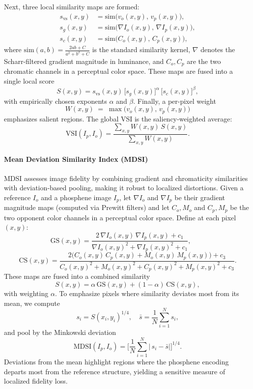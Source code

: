 Next, three local similarity maps are formed:
\begin{align*}
s_{\mathrm{vs}}(x,y)
&= \mathrm{sim}\bigl(v_o(x,y),\,v_p(x,y)\bigr),\\
s_{g}(x,y)
&= \mathrm{sim}\bigl(\nabla I_o(x,y),\,\nabla I_p(x,y)\bigr),\\
s_{c}(x,y)
&= \mathrm{sim}\bigl(C_o(x,y),\,C_p(x,y)\bigr),
\end{align*}
where \(\mathrm{sim}(a,b)=\frac{2ab + C}{a^2 + b^2 + C}\) is the standard similarity kernel, \(\nabla\) denotes the Scharr‐filtered gradient magnitude in luminance, and \(C_o,C_p\) are the two chromatic channels in a perceptual color space.  These maps are fused into a single local score
\[
S(x,y)
= s_{\mathrm{vs}}(x,y)\,\bigl[s_{g}(x,y)\bigr]^{\alpha}\,\bigl[s_{c}(x,y)\bigr]^{\beta},
\]
with empirically chosen exponents \(\alpha\) and \(\beta\).  Finally, a per-pixel weight
\[
W(x,y) \;=\;\max\!\bigl(v_o(x,y),\,v_p(x,y)\bigr)
\]
emphasizes salient regions.  The global VSI is the saliency‐weighted average:
\[
\mathrm{VSI}(I_p,I_o)
= \frac{\sum_{x,y}W(x,y)\,S(x,y)}
       {\sum_{x,y}W(x,y)}.
\]


\paragraph{Mean Deviation Similarity Index (MDSI)}  
MDSI \cite{ZiaeiNafchi2016} assesses image fidelity by combining gradient and chromaticity similarities with deviation‐based pooling, making it robust to localized distortions.  Given a reference \(I_o\) and a phosphene image \(I_p\), let \(\nabla I_o\) and \(\nabla I_p\) be their gradient magnitude maps (computed via Prewitt filters) and let \(C_o, M_o\) and \(C_p, M_p\) be the two opponent color channels in a perceptual color space.  Define at each pixel \((x,y)\):  
\[
\mathrm{GS}(x,y)
= \frac{2\,\nabla I_o(x,y)\,\nabla I_p(x,y) + c_1}
       {\nabla I_o(x,y)^2 + \nabla I_p(x,y)^2 + c_1},
\qquad
\]
\[
\mathrm{CS}(x,y)
= \frac{2\bigl(C_o(x,y)\,C_p(x,y) + M_o(x,y)\,M_p(x,y)\bigr) + c_3}
       {C_o(x,y)^2 + M_o(x,y)^2 + C_p(x,y)^2 + M_p(x,y)^2 + c_3}.
\]
These maps are fused into a combined similarity
\[
S(x,y)
= \alpha\,\mathrm{GS}(x,y) + (1-\alpha)\,\mathrm{CS}(x,y),
\]
with weighting \(\alpha\).  To emphasize pixels where similarity deviates most from its mean, we compute  
\[
s_i = S(x_i,y_i)^{1/4}, 
\quad
\bar s = \frac{1}{N}\sum_{i=1}^N s_i,
\]
and pool by the Minkowski deviation
\[
\mathrm{MDSI}(I_p,I_o)
= \biggl[\frac{1}{N}\sum_{i=1}^N \bigl|\,s_i - \bar s\bigr|\biggr]^{1/4}.
\]
Deviations from the mean highlight regions where the phosphene encoding departs most from the reference structure, yielding a sensitive measure of localized fidelity loss.  
 

